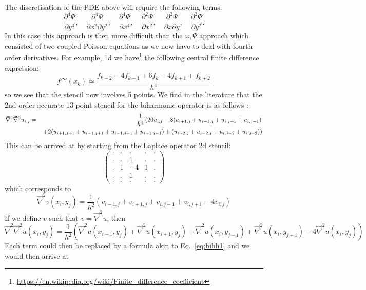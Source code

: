 The discretisation of the PDE above will require the following terms:
\[
\frac{\partial^4 \Psi}{\partial y^4}, \quad
\frac{\partial^4 \Psi}{\partial x^2\partial y^2}, \quad
\frac{\partial^4 \Psi}{\partial x^4}, \quad
\frac{\partial^2 \Psi}{\partial x^2}, \quad
\frac{\partial^2 \Psi}{\partial x\partial y}, \quad
\frac{\partial^2 \Psi}{\partial y^2}.
\]
In this case this approach is then more difficult than the $\omega,\Psi$ approach which consisted of two coupled Poisson equations as we now have to deal with fourth-order derivatives. For example, 1d we have\footnote{\url{https://en.wikipedia.org/wiki/Finite_difference_coefficient}} the following central finite difference 
expression:
\[
f''''(x_k) \simeq \frac{  f_{k-2} -4f_{k-1} +6f_k -4f_{k+1} +f_{k+2}  }{h^4}
\]
so we see that the stencil now involves 5 points. 
We find in the literature that the 2nd-order accurate 13-point stencil for the biharmonic 
operator is as follows \cite{chll08,misk25}:
\begin{eqnarray}
\vec\nabla^2 \vec\nabla^2 u_{i,j}
&=&\frac{1}{h^4} 
\left(
20 u_{i,j} - 8(u_{i+1,j} + u_{i-1,j} + u_{i,j+1} + u_{i,j-1} )  \right. \nonumber\\
&& \left. + 2 (u_{i+1,j+1} + u_{i-1,j+1} + u_{i-1,j-1} + u_{i+1,j-1} )
+ (u_{i+2,j} + u_{i-2,j} + u_{i,j+2} + u_{i,j-2} ) 
\right)
\label{eq:bihh2}
\end{eqnarray}
This can be arrived at by starting from the Laplace operator 2d stencil:
\[
\begin{pmatrix}
. & . &  . & . & . \\
. & . &  1 & . & . \\
. & 1 & -4 & 1 & . \\
. & . &  1 & . & . \\
. & . &  . & . & . 
\end{pmatrix}
\]
which corresponds to 
\begin{equation}
\vec\nabla^2 v (x_i,y_j) =  \frac{1}{h^2} (v_{i-1,j} +v_{i+1,j}+v_{i,j-1}+v_{i,j+1}-4v_{i,j} )
\label{eq:bihh1}
\end{equation}
If we define $v$ such that $v=\vec\nabla^2 u$, then
\begin{equation}
\vec\nabla^2 \vec\nabla^2 u (x_i,y_j) 
=  \frac{1}{h^2} \left(
\vec\nabla^2 u (x_{i-1},y_j)+
\vec\nabla^2 u (x_{i+1},y_j)+
\vec\nabla^2 u (x_i,y_{j-1})+
\vec\nabla^2 u (x_i,y_{j+1})
-4\vec\nabla^2 u (x_i,y_j)
\right)
\label{eq:bihh3}
\end{equation}
Each term could then be replaced by a formula akin to Eq.~\eqref{eq:bihh1} and we would then arrive at 
